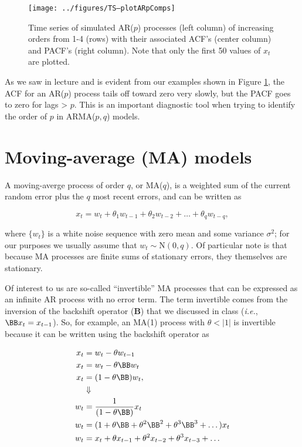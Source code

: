\begin{figure}[htp]
\begin{center}
\texttt{[image: ../figures/TS--plotARpComps]}
\end{center}
\caption{Time series of simulated AR($p$) processes (left column) of increasing orders from 1-4 (rows) with their associated ACF's (center column) and PACF's (right column).  Note that only the first 50 values of $x_t$ are plotted.}
\label{fig:LW1.ARpComps}
\end{figure}

\noindent As we saw in lecture and is evident from our examples shown in Figure \ref{fig:LW1.ARpComps}, the ACF for an AR($p$) process tails off toward zero very slowly, but the PACF goes to zero for lags > $p$.  This is an important diagnostic tool when trying to identify the order of $p$ in ARMA($p,q$) models.

\section{Moving-average (MA) models}

A moving-averge process of order $q$, or MA($q$), is a weighted sum of the current random error plus the $q$ most recent errors, and can be written as

\begin{equation}\label{eqn:LW1.MAdefn}
x_t = w_t + \theta_1 w_{t-1} + \theta_2 w_{t-2} + \dots + \theta_q w_{t-q},
\end{equation}

\noindent where $\{w_t\}$ is a white noise sequence with zero mean and some variance $\sigma^2$; for our purposes we usually assume that $w_t \sim \text{N}(0,q)$.  Of particular note is that because MA processes are finite sums of stationary errors, they themselves are stationary.

Of interest to us are so-called ``invertible'' MA processes that can be expressed as an infinite AR process with no error term.  The term invertible comes from the inversion of the backshift operator (\textbf{B}) that we discussed in class (\emph{i.e.}, $\BB x_t= x_{t-1}$).  So, for example, an MA(1) process with $\theta < \lvert 1 \rvert$ is invertible because it can be written using the backshift operator as

\begin{equation}\label{eqn:LW1.RWasB}
\begin{aligned}
x_t &= w_t - \theta w_{t-1} \\
x_t &= w_t - \theta \BB w_t \\
x_t &= (1 - \theta \BB) w_t, \\
    &\Downarrow \\
w_t &= \frac{1}{(1 - \theta \BB)} x_t \\
w_t &= (1 + \theta \BB + \theta^2 \BB^2 + \theta^3 \BB^3 + \dots) x_t \\
w_t &= x_t + \theta x_{t-1} + \theta^2 x_{t-2} + \theta^3 x_{t-3} + \dots
\end{aligned}
\end{equation}



